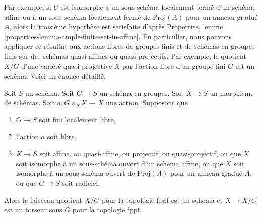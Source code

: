 \noindent
Par exemple, si $U$ est isomorphe à un sous-schéma localement fermé d'un
schéma affine ou à un sous-schéma localement fermé de
$\text{Proj}(A)$ pour un anneau gradué $A$, alors la troisième hypothèse est satisfaite d'après
Properties, lemme \ref{properties-lemma-ample-finite-set-in-affine}.
En particulier, nous pouvons appliquer ce résultat aux actions libres de groupes finis et de
schémas en groupes finis sur des schémas quasi-affines ou quasi-projectifs.
Par exemple, le quotient $X/G$ d'une variété quasi-projective
$X$ par l'action libre d'un groupe fini $G$ est un schéma. Voici un
énoncé détaillé.

\begin{lemma}
\label{lemma-quotient-scheme}
Soit $S$ un schéma. Soit $G \to S$ un schéma en groupes. Soit $X \to S$ un
morphisme de schémas. Soit $a : G \times_S X \to X$ une action. Supposons que
\begin{enumerate}
\item $G \to S$ soit fini localement libre,
\item l'action $a$ soit libre,
\item $X \to S$ soit affine, ou quasi-affine, ou projectif, ou
quasi-projectif, ou que $X$ soit isomorphe à un sous-schéma ouvert d'un
schéma affine, ou que $X$ soit isomorphe à un sous-schéma ouvert de $\text{Proj}(A)$
pour un anneau gradué $A$, ou que $G \to S$ soit radiciel.
\end{enumerate}
Alors le faisceau quotient $X/G$ pour la topologie fppf est un schéma et $X \to X/G$
est un torseur sous $G$ pour la topologie fppf.
\end{lemma}

